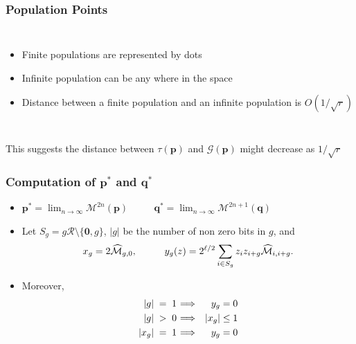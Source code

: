 \documentclass[aspectratio=169]{beamer}
\newcommand{\nudge}{\hspace{0.01in}}
\begin{document}
  \begin{frame}
    \frametitle{Population Points }
    \begin{columns}
	\centering
	\begin{itemize}
	  \item{Finite populations are represented by dots}
	  \item{Infinite population can be any where in the space}
	  \item{Distance between a finite population and an infinite population is  $O(1/\sqrt{r})$}
	\end{itemize}
    \end{columns}
    This suggests the distance between $\tau(\bm{p})$ and $\mathcal{G}(\bm{p})$ might decrease as $1/\sqrt{r}$
  \end{frame}
  
  \begin{frame}
    \frametitle{Computation of $\bm{p}^\ast$ and ${\bm q}^\ast$ }
    \begin{itemize}
      \item
      $\bm{p}^\ast = \lim_{n \rightarrow \infty} \mathcal{M}^{2n}({\bm p})$ $\quad \quad$
      ${\bm q}^\ast = \lim_{n \rightarrow \infty} \mathcal{M}^{2n+1}({\bm q})$
      \item
      Let $S_g = g \mathcal{R} \setminus \{\textbf{0}, g\} $,  $|g|$ be the number of non zero bits in $g$, and
      \[
      x_g = 2\widehat{\mathcal{M}}_{g,0},  \hspace*{1cm} y_g(z) = 2^{\ell /2} \sum_{i \in S_g} z_i z_{i+g} \widehat{\mathcal{M}}_{i,i+g}.
      \]
      \item
      Moreover, 
      \begin{eqnarray*}
      |g| \;=\; 1 \nudge & \Longrightarrow & y_g = 0 \\
      |g| \;>\; 0 \nudge & \Longrightarrow & |x_g| \leq 1 \\
      |x_g| \;=\; 1 \nudge & \Longrightarrow & y_g = 0
      \end{eqnarray*}
   \end{itemize}
  \end{frame}
\end{document}
